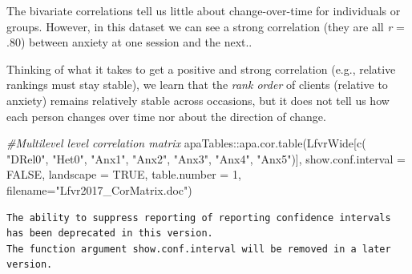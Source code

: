 \documentclass[
  english,
]{book}
\newenvironment{Shaded}{\begin{snugshade}}{\end{snugshade}}
\newcommand{\AttributeTok}[1]{\textcolor[rgb]{0.77,0.63,0.00}{#1}}
\newcommand{\CommentTok}[1]{\textcolor[rgb]{0.56,0.35,0.01}{\textit{#1}}}
\newcommand{\ConstantTok}[1]{\textcolor[rgb]{0.00,0.00,0.00}{#1}}
\newcommand{\DecValTok}[1]{\textcolor[rgb]{0.00,0.00,0.81}{#1}}
\newcommand{\FunctionTok}[1]{\textcolor[rgb]{0.00,0.00,0.00}{#1}}
\newcommand{\NormalTok}[1]{#1}
\newcommand{\SpecialCharTok}[1]{\textcolor[rgb]{0.00,0.00,0.00}{#1}}
\newcommand{\StringTok}[1]{\textcolor[rgb]{0.31,0.60,0.02}{#1}}
\begin{document}
The bivariate correlations tell us little about change-over-time for individuals or groups. However, in this dataset we can see a strong correlation (they are all \emph{r} = .80) between anxiety at one session and the next..

Thinking of what it takes to get a positive and strong correlation (e.g., relative rankings must stay stable), we learn that the \emph{rank order} of clients (relative to anxiety) remains relatively stable across occasions, but it does not tell us how each person changes over time nor about the direction of change.

\begin{Shaded}
\begin{Highlighting}[]
\CommentTok{\#Multilevel level correlation matrix}
\NormalTok{apaTables}\SpecialCharTok{::}\FunctionTok{apa.cor.table}\NormalTok{(LfvrWide[}\FunctionTok{c}\NormalTok{(}
\StringTok{"DRel0"}\NormalTok{, }\StringTok{"Het0"}\NormalTok{, }\StringTok{"Anx1"}\NormalTok{, }\StringTok{"Anx2"}\NormalTok{, }\StringTok{"Anx3"}\NormalTok{, }\StringTok{"Anx4"}\NormalTok{, }\StringTok{"Anx5"}\NormalTok{)], }\AttributeTok{show.conf.interval =} \ConstantTok{FALSE}\NormalTok{, }\AttributeTok{landscape =} \ConstantTok{TRUE}\NormalTok{, }\AttributeTok{table.number =} \DecValTok{1}\NormalTok{, }\AttributeTok{filename=}\StringTok{"Lfvr2017\_CorMatrix.doc"}\NormalTok{)}
\end{Highlighting}
\end{Shaded}

\begin{verbatim}
The ability to suppress reporting of reporting confidence intervals has been deprecated in this version.
The function argument show.conf.interval will be removed in a later version.
\end{verbatim}
\end{document}
